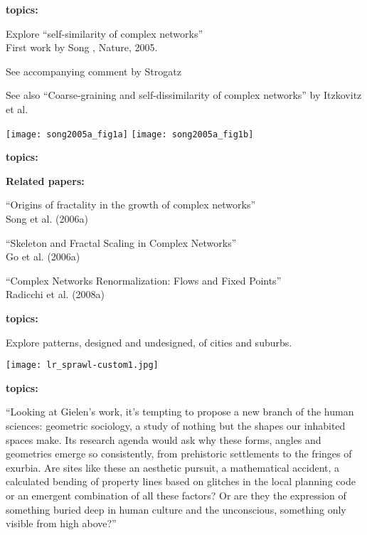       \textbf{topics:}

    
    
        
      Explore ``self-similarity of complex networks''\cite{song2005a,song2006a}\\
      First work by Song \etal, Nature, 2005.
    
      See accompanying comment by Strogatz\cite{strogatz2005a}
    
      See also ``Coarse-graining and self-dissimilarity of complex networks'' by
      Itzkovitz et al.\cite{itzkovitz2005a}
    
    \texttt{[image: song2005a\_fig1a]}
    \texttt{[image: song2005a\_fig1b]}
    

  

      \textbf{topics:}

    \textbf{Related papers:}
      
      
        ``Origins of fractality in the growth of complex networks''\\
        Song et al. (2006a)\cite{song2006a}
      
        ``Skeleton and Fractal Scaling in Complex Networks''\\
        Go et al. (2006a)\cite{goh2006a}
      
        ``Complex Networks Renormalization: Flows and Fixed Points''\\
        Radicchi et al. (2008a)\cite{radicchi2008a}
      
    
    
  
      \textbf{topics:}

    
    
     
      Explore patterns, designed and undesigned, of cities
      and suburbs.
    

    \begin{center}
      \texttt{[image: lr\_sprawl-custom1.jpg]}
    \end{center}
    

  
      \textbf{topics:}

    
      \small
      ``Looking at Gielen's work, it's tempting to propose a new branch of the
      human sciences: geometric sociology, a study of nothing but the shapes
      our inhabited spaces make. Its research agenda would ask why these
      forms, angles and geometries emerge so consistently, from prehistoric
      settlements to the fringes of exurbia. Are sites like these an
      aesthetic pursuit, a mathematical accident, a calculated bending of
      property lines based on glitches in the local planning code or an
      emergent combination of all these factors? Or are they the expression
      of something buried deep in human culture and the unconscious,
      something only visible from high above?''
    

